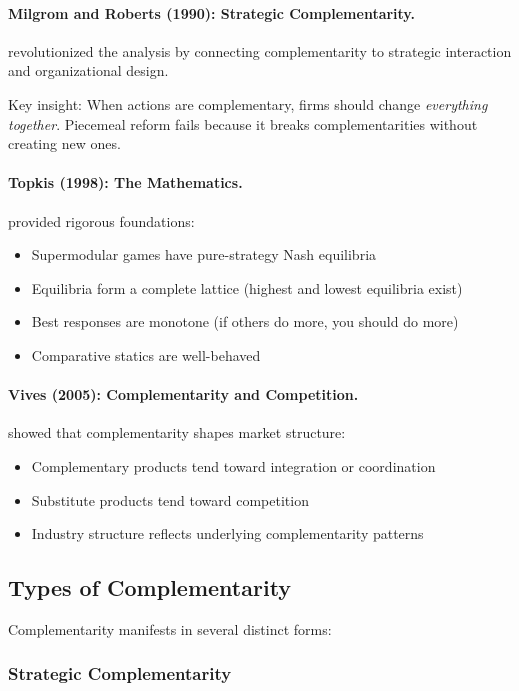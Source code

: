 \documentclass[12pt,a4paper]{article}
\begin{document}
\paragraph{Milgrom and Roberts (1990): Strategic Complementarity.}
\citet{milgromroberts1990} revolutionized the analysis by connecting complementarity
to strategic interaction and organizational design.

Key insight: When actions are complementary, firms should change \emph{everything together}.
Piecemeal reform fails because it breaks complementarities without creating new ones.

\paragraph{Topkis (1998): The Mathematics.}
\citet{topkis1998} provided rigorous foundations:
\begin{itemize}
  \item Supermodular games have pure-strategy Nash equilibria
  \item Equilibria form a complete lattice (highest and lowest equilibria exist)
  \item Best responses are monotone (if others do more, you should do more)
  \item Comparative statics are well-behaved
\end{itemize}

\paragraph{Vives (2005): Complementarity and Competition.}
\citet{vives2005} showed that complementarity shapes market structure:
\begin{itemize}
  \item Complementary products tend toward integration or coordination
  \item Substitute products tend toward competition
  \item Industry structure reflects underlying complementarity patterns
\end{itemize}

\subsection{Types of Complementarity}

Complementarity manifests in several distinct forms:

\subsubsection{Strategic Complementarity}
\end{document}
